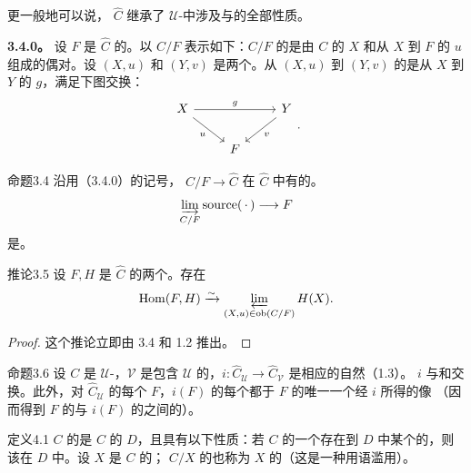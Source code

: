 更一般地可以说， $\widehat C$ 继承了 $\mathcal U$-中涉及与的全部性质。

\textbf{3.4.0。} 设 $F$ 是 $\widehat C$ 的。以 $C/F$ 表示如下：$C/F$ 的是由 $C$ 的 $X$ 和从 $X$ 到 $F$ 的 $u$ 组成的偶对。设 $(X,u)$ 和 $(Y,v)$ 是两个。从 $(X,u)$ 到 $(Y,v)$ 的是从 $X$ 到 $Y$ 的 $g$，满足下图交换：
\[\begin{tikzcd}X\arrow[rr,"g"]\arrow[dr,"u"']&&Y\arrow[dl,"v"]\\&F&\end{tikzcd}.\]
\begin{SGAresult}{命题}{3.4}
沿用（3.4.0）的记号， $C/F\to\widehat C$ 在 $\widehat C$ 中有的。
\[\varinjlim_{C/F}\operatorname{source}(\,\cdot\,)\longrightarrow F\]
是。
\end{SGAresult}
\begin{SGAresult}{推论}{3.5}
设 $F,H$ 是 $\widehat C$ 的两个。存在
\[\operatorname{Hom}(F,H)\xrightarrow{\sim}\varprojlim_{(X,u)\in\operatorname{ob}(C/F)}H(X).\]
\end{SGAresult}
\begin{proof}这个推论立即由 3.4 和 1.2 推出。\end{proof}
\begin{SGAresult}{命题}{3.6}
设 $C$ 是 $\mathcal U$-，$\mathcal V$ 是包含 $\mathcal U$ 的，$i:\widehat C_{\mathcal U}\to\widehat C_{\mathcal V}$ 是相应的自然（1.3）。 $i$ 与和交换。此外，对 $\widehat C_{\mathcal U}$ 的每个 $F$，$i(F)$ 的每个都于 $F$ 的唯一一个经 $i$ 所得的像
（因而得到 $F$ 的与 $i(F)$ 的之间的）。
\end{SGAresult}
\begin{SGAresult}{定义}{4.1}
 $C$ 的是 $C$ 的 $D$，且具有以下性质：若 $C$ 的一个存在到 $D$ 中某个的，则该在 $D$ 中。设 $X$ 是 $C$ 的； $C/X$ 的也称为 $X$ 的（这是一种用语滥用）。
\end{SGAresult}
